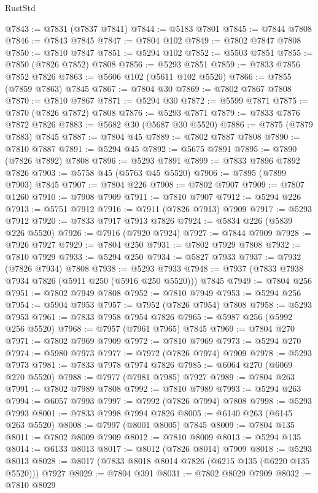 \begin{lexlean}{RustStd}
\begin{coremodule}
@7843 := @7831 (@7837 @7841)
@7844 := @5183 @7801
@7845 := @7844 @7808
@7846 := @7843 @7845
@7847 := @7804 @102
@7849 := @7802 @7847 @7808
@7850 := @7810 @7847
@7851 := @5294 @102
@7852 := @5503 @7851
@7855 := @7850 (@7826 @7852) @7808
@7856 := @5293 @7851
@7859 := @7833 @7856 @7852 @7826
@7863 := @5606 @102 (@5611 @102 @5520)
@7866 := @7855 (@7859 @7863) @7845
@7867 := @7804 @30
@7869 := @7802 @7867 @7808
@7870 := @7810 @7867
@7871 := @5294 @30
@7872 := @5599 @7871
@7875 := @7870 (@7826 @7872) @7808
@7876 := @5293 @7871
@7879 := @7833 @7876 @7872 @7826
@7883 := @5682 @30 (@5687 @30 @5520)
@7886 := @7875 (@7879 @7883) @7845
@7887 := @7804 @45
@7889 := @7802 @7887 @7808
@7890 := @7810 @7887
@7891 := @5294 @45
@7892 := @5675 @7891
@7895 := @7890 (@7826 @7892) @7808
@7896 := @5293 @7891
@7899 := @7833 @7896 @7892 @7826
@7903 := @5758 @45 (@5763 @45 @5520)
@7906 := @7895 (@7899 @7903) @7845
@7907 := @7804 @226
@7908 := @7802 @7907
@7909 := @7807 @1260
@7910 := @7908 @7909
@7911 := @7810 @7907
@7912 := @5294 @226
@7913 := @5751 @7912
@7916 := @7911 (@7826 @7913) @7909
@7917 := @5293 @7912
@7920 := @7833 @7917 @7913 @7826
@7924 := @5834 @226 (@5839 @226 @5520)
@7926 := @7916 (@7920 @7924)
@7927 := @7844 @7909
@7928 := @7926 @7927
@7929 := @7804 @250
@7931 := @7802 @7929 @7808
@7932 := @7810 @7929
@7933 := @5294 @250
@7934 := @5827 @7933
@7937 := @7932 (@7826 @7934) @7808
@7938 := @5293 @7933
@7948 := @7937 (@7833 @7938 @7934 @7826 (@5911 @250 (@5916 @250 @5520))) @7845
@7949 := @7804 @256
@7951 := @7802 @7949 @7808
@7952 := @7810 @7949
@7953 := @5294 @256
@7954 := @5904 @7953
@7957 := @7952 (@7826 @7954) @7808
@7958 := @5293 @7953
@7961 := @7833 @7958 @7954 @7826
@7965 := @5987 @256 (@5992 @256 @5520)
@7968 := @7957 (@7961 @7965) @7845
@7969 := @7804 @270
@7971 := @7802 @7969 @7909
@7972 := @7810 @7969
@7973 := @5294 @270
@7974 := @5980 @7973
@7977 := @7972 (@7826 @7974) @7909
@7978 := @5293 @7973
@7981 := @7833 @7978 @7974 @7826
@7985 := @6064 @270 (@6069 @270 @5520)
@7988 := @7977 (@7981 @7985) @7927
@7989 := @7804 @263
@7991 := @7802 @7989 @7808
@7992 := @7810 @7989
@7993 := @5294 @263
@7994 := @6057 @7993
@7997 := @7992 (@7826 @7994) @7808
@7998 := @5293 @7993
@8001 := @7833 @7998 @7994 @7826
@8005 := @6140 @263 (@6145 @263 @5520)
@8008 := @7997 (@8001 @8005) @7845
@8009 := @7804 @135
@8011 := @7802 @8009 @7909
@8012 := @7810 @8009
@8013 := @5294 @135
@8014 := @6133 @8013
@8017 := @8012 (@7826 @8014) @7909
@8018 := @5293 @8013
@8028 := @8017 (@7833 @8018 @8014 @7826 (@6215 @135 (@6220 @135 @5520))) @7927
@8029 := @7804 @391
@8031 := @7802 @8029 @7909
@8032 := @7810 @8029

\end{coremodule}
\end{lexlean}
